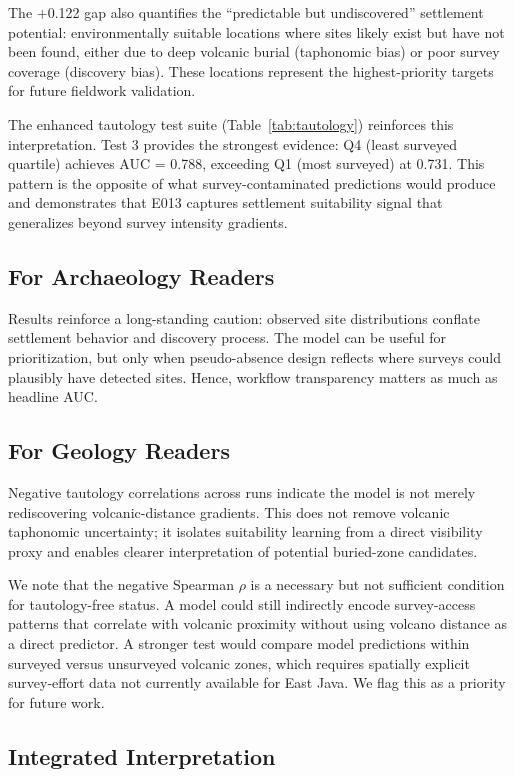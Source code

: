 \documentclass{article}
\begin{document}
The $+$0.122 gap also quantifies the ``predictable but undiscovered'' settlement potential: environmentally suitable locations where sites likely exist but have not been found, either due to deep volcanic burial (taphonomic bias) or poor survey coverage (discovery bias). These locations represent the highest-priority targets for future fieldwork validation.

The enhanced tautology test suite (Table~\ref{tab:tautology}) reinforces this interpretation. Test 3 provides the strongest evidence: Q4 (least surveyed quartile) achieves AUC = 0.788, exceeding Q1 (most surveyed) at 0.731. This pattern is the opposite of what survey-contaminated predictions would produce and demonstrates that E013 captures settlement suitability signal that generalizes beyond survey intensity gradients.

\subsection{For Archaeology Readers}

Results reinforce a long-standing caution: observed site distributions conflate settlement behavior and discovery process.
The model can be useful for prioritization, but only when pseudo-absence design reflects where surveys could plausibly have detected sites.
Hence, workflow transparency matters as much as headline AUC.

\subsection{For Geology Readers}

Negative tautology correlations across runs indicate the model is not merely rediscovering volcanic-distance gradients.
This does not remove volcanic taphonomic uncertainty; it isolates suitability learning from a direct visibility proxy and enables clearer interpretation of potential buried-zone candidates.

We note that the negative Spearman $\rho$ is a necessary but not sufficient condition for tautology-free status. A model could still indirectly encode survey-access patterns that correlate with volcanic proximity without using volcano distance as a direct predictor. A stronger test would compare model predictions within surveyed versus unsurveyed volcanic zones, which requires spatially explicit survey-effort data not currently available for East Java. We flag this as a priority for future work.

\subsection{Integrated Interpretation}
\end{document}
